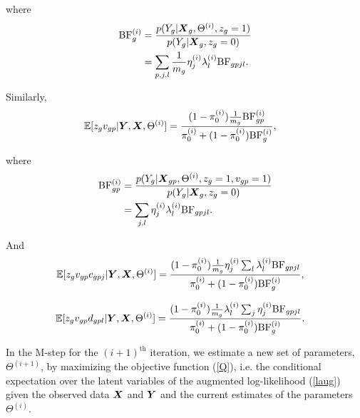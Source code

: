\documentclass[10pt]{article}
\newcommand{\Exp}{\mathbb{E}} %
\newcommand{\BF}{{\text{BF}}} %
\newcommand{\Xv}{\mbox{\boldmath$X$}}
\newcommand{\Yv}{\mbox{\boldmath$Y$}}
\begin{document}
where 
\begin{equation*}
  \begin{aligned}
    \BF^{(i)}_{g} &= \frac{p(Y_g | \Xv_g, \Theta^{(i)}, z_g=1)}{p(Y_g | \Xv_g, z_g=0)} \\
    &= \sum_{p,j,l} \frac{1}{m_g} \eta_j^{(i)} \lambda_l^{(i)} \BF_{gpjl}.
  \end{aligned}
\end{equation*}

Similarly,
\begin{equation}
  \begin{aligned}
    \Exp[z_g v_{gp} | \Yv, \Xv, \Theta^{(i)}] &= \frac{(1-\pi_0^{(i)}) \frac{1}{m_g} \BF^{(i)}_{gp}}{\pi_0^{(i)} + (1-\pi_0^{(i)}) \BF^{(i)}_{g}},
  \end{aligned}
\end{equation}

where 
\begin{equation*}
  \begin{aligned}
    \BF^{(i)}_{gp} &= \frac{p(Y_g | \Xv_{gp}, \Theta^{(i)}, z_g=1, v_{gp}=1)}{p(Y_g | \Xv_g, z_g=0)} \\
    &=\sum_{j,l} \eta_j^{(i)} \lambda_l^{(i)} \BF_{gpjl}.
  \end{aligned}
\end{equation*}

And
\begin{equation}
  \begin{aligned}
    \Exp[z_g v_{gp} c_{gpj} | \Yv, \Xv, \Theta^{(i)}] &= \frac{(1-\pi_0^{(i)}) \frac{1}{m_g} \eta_j^{(i)} \sum_l \lambda_l^{(i)} \BF_{gpjl}}{\pi_0^{(i)} + (1-\pi_0^{(i)}) \BF^{(i)}_{g}},
  \end{aligned}
\end{equation}

\begin{equation}
  \begin{aligned}
    \Exp[z_g v_{gp} d_{gpl} | \Yv, \Xv, \Theta^{(i)}] &= \frac{(1-\pi_0^{(i)}) \frac{1}{m_g} \lambda_l^{(i)} \sum_j \eta_j^{(i)} \BF_{gpjl}}{\pi_0^{(i)} + (1-\pi_0^{(i)}) \BF^{(i)}_{g}}.
  \end{aligned}
\end{equation}


In the M-step for the $(i+1)^{\text{th}}$ iteration, we estimate a new set of parameters, $\Theta^{(i+1)}$, by maximizing the objective function (\ref{Q}), i.e. the conditional expectation over the latent variables of the augmented log-likelihood (\ref{laug}) given the observed data $\Xv$ and $\Yv$ and the current estimates of the parameters $\Theta^{(i)}$.
\end{document}
